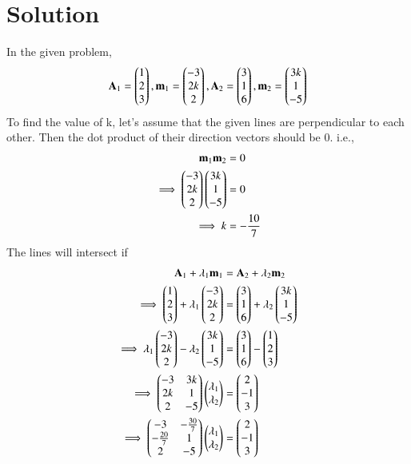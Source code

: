 \documentclass[journal,12pt,twocolumn]{IEEEtran}
\begin{document}
\section{Solution}
In the given problem,
\begin{align}
	\mathbf{A}_1 = \begin{pmatrix}1 \\ 2 \\ 3\end{pmatrix}, \mathbf{m}_1 = \begin{pmatrix}-3\\ 2k\\ 2\end{pmatrix}, \mathbf{A}_2 = \begin{pmatrix}3\\ 1 \\ 6\end{pmatrix}, \mathbf{m}_2 = \begin{pmatrix}3k \\ 1 \\ -5\end{pmatrix}
\end{align}
To find the value of k, let's assume that the given lines are perpendicular to each other. Then the dot product of their direction vectors should be 0. i.e.,
\begin{align}
	\mathbf{m}_1 \mathbf{m}_2 &= 0\\
	\implies \begin{pmatrix}-3\\ 2k\\ 2\end{pmatrix} \begin{pmatrix}3k \\ 1 \\ -5\end{pmatrix} &= 0\\
	\implies k &= -\frac{10}{7}
\end{align}
The lines will intersect if 
\begin{align}
\mathbf{A}_1 + \lambda_1 \mathbf{m}_1 &= \mathbf{A}_2 + \lambda_2 \mathbf{m}_2 \\
\implies \begin{pmatrix}1 \\ 2 \\ 3\end{pmatrix} + \lambda_1\begin{pmatrix}-3\\ 2k\\ 2\end{pmatrix} &= \begin{pmatrix}3\\ 1 \\ 6\end{pmatrix} + \lambda_2\begin{pmatrix}3k \\ 1 \\ -5\end{pmatrix}\\
\implies \lambda_1\begin{pmatrix}-3\\ 2k\\ 2\end{pmatrix} - \lambda_2\begin{pmatrix}3k \\ 1 \\ -5\end{pmatrix} &= \begin{pmatrix}3\\ 1 \\ 6\end{pmatrix}  - \begin{pmatrix}1 \\ 2 \\ 3\end{pmatrix}\\
\implies \begin{pmatrix}-3 & 3k \\ 2k & 1\\ 2 & -5\end{pmatrix} \begin{pmatrix}\lambda_1 \\ \lambda_2\end{pmatrix} &= \begin{pmatrix}2 \\ -1 \\ 3\end{pmatrix}\\
\implies \begin{pmatrix}-3 & -\frac{30}{7} \\ -\frac{20}{7} & 1\\ 2 & -5\end{pmatrix} \begin{pmatrix}\lambda_1 \\ \lambda_2\end{pmatrix} &= \begin{pmatrix}2 \\ -1 \\ 3\end{pmatrix} \label{eql1l2}
\end{align}
\end{document}
